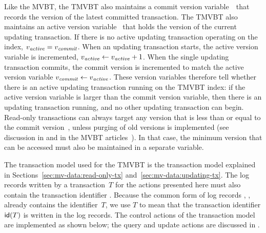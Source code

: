 Like the MVBT, the TMVBT also maintains a commit version variable~\comver\
that records the version of the latest committed transaction.
The TMVBT also maintains an active version
variable~\actver{}\label{def:actver} that holds the version
of the current updating transaction.
If there is no active updating transaction operating on the index, $\smash{v_{\text{\textit{active}}}} =
\smash{v_{\text{\textit{commit}}}}$.
When an updating transaction starts, the active version variable is
incremented, $\smash{v_{\text{\textit{active}}}} \leftarrow \smash{v_{\text{\textit{active}}}} + 1$.
When the single updating transaction commits, the commit version is
incremented to match the active version variable $\smash{v_{\text{\textit{commit}}}} \leftarrow
\smash{v_{\text{\textit{active}}}}$.
These version variables therefore tell whether there is an active updating
transaction running on the TMVBT index: if the active version variable is
larger than the commit version variable, then there is an updating
transaction running, and no other updating transaction can begin.
Read-only transactions can always target any version that is less than
or equal to the commit version~\comver, unless purging of old versions is
implemented (see discussion in \secref{sec:tsbmvbt:mvbt} and in the MVBT
articles~\cite{becker:1993:optimal,becker:1996:mvbt}).
In that case, the minimum version that can be accessed must also be
maintained in a separate variable.

The transaction model used for the TMVBT is the transaction model
explained in Sections~\ref{sec:mv-data:read-only-tx}
and~\ref{sec:mv-data:updating-tx}.
The log records written by a transaction~$T$ for the actions presented here
must also contain the transaction identifier \txid{T}.
Because the common form of log records
, , \lre{\ldots} already contains the identifier~$T$,
we use $T$ to mean that the transaction identifier $\text{\textsf{id}}(T)$ is written in
the log records.
The control actions of the transaction model are implemented as shown below;
the query and update actions are discussed in \secref{sec:tmvbt:actions}.

